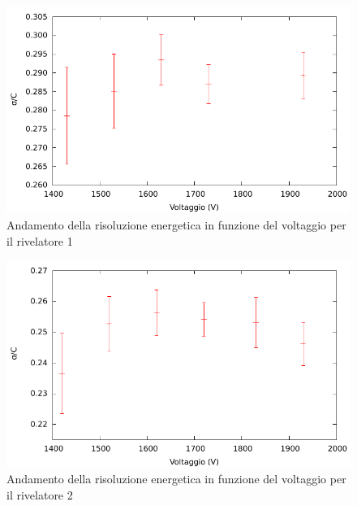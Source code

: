 \documentclass[a4paper,11pt,italian]{report}
\begin{document}
\begin{minipage}{\linewidth}
\begin{minipage}{0.45\linewidth}
\centering
\begin{figure}[H]
\includegraphics[width=\columnwidth,keepaspectratio]{../out/chio/Guadagno_R1}
\caption{\small{Andamento della risoluzione energetica in funzione del voltaggio per il rivelatore 1}}
\end{figure}
\end{minipage}
\hspace{\fill}
\begin{minipage}{0.45\linewidth}
\centering
\begin{figure}[H]
\includegraphics[width=\columnwidth,keepaspectratio]{../out/chio/Guadagno_R2}
\caption{\small{Andamento della risoluzione energetica in funzione del voltaggio per il rivelatore 2}}
\end{figure}
\end{minipage}
\end{minipage}
\end{document}
